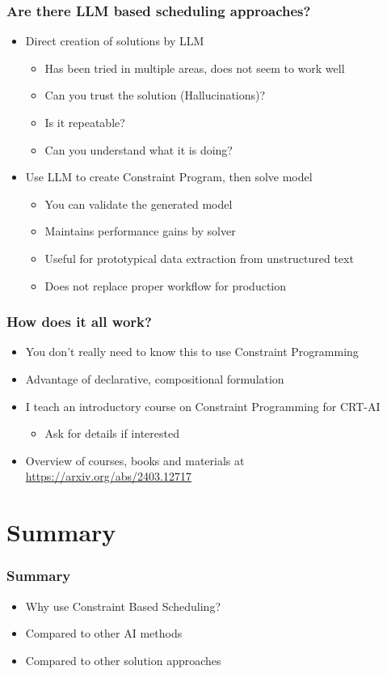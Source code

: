 \begin{frame}
\frametitle{Are there LLM based scheduling approaches?}
\begin{itemize}
\item Direct creation of solutions by LLM
\begin{itemize}
\item Has been tried in multiple areas, does not seem to work well
\item Can you trust the solution (Hallucinations)?
\item Is it repeatable?
\item Can you understand what it is doing?
\end{itemize}
\item Use LLM to create Constraint Program, then solve model
\begin{itemize}
\item You can validate the generated model
\item Maintains performance gains by solver 
\item Useful for prototypical data extraction from unstructured text
\item Does not replace proper workflow for production
\end{itemize}
\end{itemize}
\end{frame}

\begin{frame}
\frametitle{How does it all work?}
\begin{itemize}
\item You don't really need to know this to use Constraint Programming
\item Advantage of declarative, compositional formulation
\item I teach an introductory course on Constraint Programming for CRT-AI
\begin{itemize}
\item Ask for details if interested
\end{itemize}

\item Overview of courses, books and materials at \url{https://arxiv.org/abs/2403.12717}
\end{itemize}
\end{frame}


\section{Summary}

\begin{frame}
\frametitle{Summary}
\begin{itemize}
\item Why use Constraint Based Scheduling?
\item Compared to other AI methods
\item Compared to other solution approaches
\end{itemize}
\end{frame}

